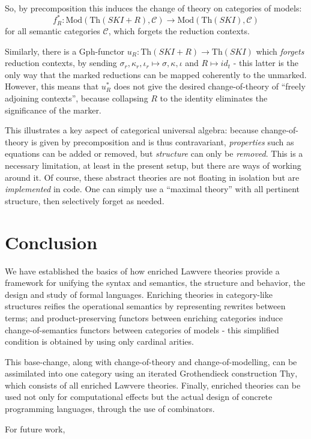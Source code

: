 \documentclass[a4paper,UKenglish]{article}
\theoremstyle{definition}
\newcommand{\Th}{\mathrm{Th}}
\newcommand{\Gph}{\mathrm{Gph}}
\newcommand{\Mod}{\mathrm{Mod}}
\newcommand{\C}{\mathscr{C}}
\begin{document}
So, by precomposition this induces the change of theory on categories of models: $$f_R^*: \Mod(\Th(SKI+R),\C) \to \Mod(\Th(SKI),\C)$$ for all semantic categories $\C$, which forgets the reduction contexts.

Similarly, there is a $\Gph$-functor $u_R: \Th(SKI+R)\to \Th(SKI)$ which \textit{forgets} reduction contexts, by sending $\sigma_r,\kappa_r,\iota_r \mapsto\sigma, \kappa,\iota$ and $R \mapsto id_t$ - this latter is the only way that the marked reductions can be mapped coherently to the unmarked. However, this means that $u_R^*$ does not give the desired change-of-theory of ``freely adjoining contexts'', because collapsing $R$ to the identity eliminates the significance of the marker.

This illustrates a key aspect of categorical universal algebra: because change-of-theory is given by precomposition and is thus contravariant, \textit{properties} such as equations can be added or removed, but \textit{structure} can only be \textit{removed}. This is a necessary limitation, at least in the present setup, but there are ways of working around it. Of course, these abstract theories are not floating in isolation but are \textit{implemented} in code. One can simply use a ``maximal theory'' with all pertinent structure, then selectively forget as needed.

\section{Conclusion}

We have established the basics of how enriched Lawvere theories provide a framework for unifying the syntax and semantics, the structure and behavior, the design and study of formal languages. Enriching theories in category-like structures reifies the operational semantics by representing rewrites between terms; and product-preserving functors between enriching categories induce change-of-semantics functors between categories of models - this simplified condition is obtained by using only cardinal arities.

This base-change, along with change-of-theory and change-of-modelling, can be assimilated into one category using an iterated Grothendieck construction $\mathrm{Thy}$, which consists of all enriched Lawvere theories. Finally, enriched theories can be used not only for computational effects but the actual design of concrete programming languages, through the use of combinators.

For future work,

\newpage



\end{document}
